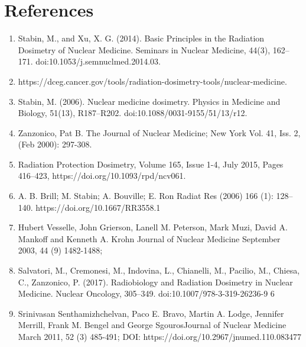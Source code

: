 \documentclass[12pt]{article}
\begin{document}
\section{References}
\begin{enumerate}
\item Stabin, M., and Xu, X. G. (2014). Basic Principles in the Radiation Dosimetry of Nuclear Medicine. Seminars in Nuclear Medicine, 44(3), 162–171. doi:10.1053/j.semnuclmed.2014.03.
\item https://dceg.cancer.gov/tools/radiation-dosimetry-tools/nuclear-medicine.
\item Stabin, M. (2006). Nuclear medicine dosimetry. Physics in Medicine and Biology, 51(13), R187–R202. doi:10.1088/0031-9155/51/13/r12.
\item Zanzonico, Pat B. The Journal of Nuclear Medicine; New York Vol. 41, Iss. 2,  (Feb 2000): 297-308.
\item Radiation Protection Dosimetry, Volume 165, Issue 1-4, July 2015, Pages 416–423, https://doi.org/10.1093/rpd/ncv061.
\item A. B. Brill; M. Stabin; A. Bouville; E. Ron Radiat Res (2006) 166 (1): 128–140. https://doi.org/10.1667/RR3558.1
\item Hubert Vesselle, John Grierson, Lanell M. Peterson, Mark Muzi, David A. Mankoff and Kenneth A. Krohn Journal of Nuclear Medicine September 2003, 44 (9) 1482-1488;
\item Salvatori, M., Cremonesi, M., Indovina, L., Chianelli, M., Pacilio, M., Chiesa, C.,  Zanzonico, P. (2017). Radiobiology and Radiation Dosimetry in Nuclear Medicine. Nuclear Oncology, 305–349. doi:10.1007/978-3-319-26236-9 6
\item Srinivasan Senthamizhchelvan, Paco E. Bravo, Martin A. Lodge, Jennifer Merrill, Frank M. Bengel and George SgourosJournal of Nuclear Medicine March 2011, 52 (3) 485-491; DOI: https://doi.org/10.2967/jnumed.110.083477 
\end{enumerate}
\end{document}
